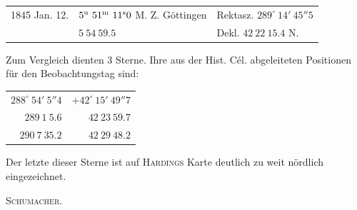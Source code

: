 \begin{center}
\setlength{\tabcolsep}{3pt}
\begin{tabular}{lll}
1845 Jan. 12. & $5^{\rm u}\ 51^{\rm m}\ 11^{\rm s}0$ M. Z. Göttingen & Rektasz. $289^\circ\ 14'\ 45''5$ \\
 & $5\ 54\ 59.5$ & Dekl. $42\ 22\ 15.4$ N. \\
\end{tabular}
\end{center}

Zum Vergleich dienten 3 Sterne. Ihre aus der Hist. Cél. abgeleiteten Positionen für den Beobachtungstag sind:

\begin{center}
\begin{tabular}{rr}
$288^\circ\ 54'\ 5''4$ & $+42^\circ\ 15'\ 49''7$ \\
$289\ 1\ 5.6$ & $42\ 23\ 59.7$ \\
$290\ 7\ 35.2$ & $42\ 29\ 48.2$ \\
\end{tabular}
\end{center}

Der letzte dieser Sterne ist auf \textsc{Hardings} Karte deutlich zu weit nördlich eingezeichnet.
\begin{flushright}\textsc{Schumacher}.\end{flushright}
